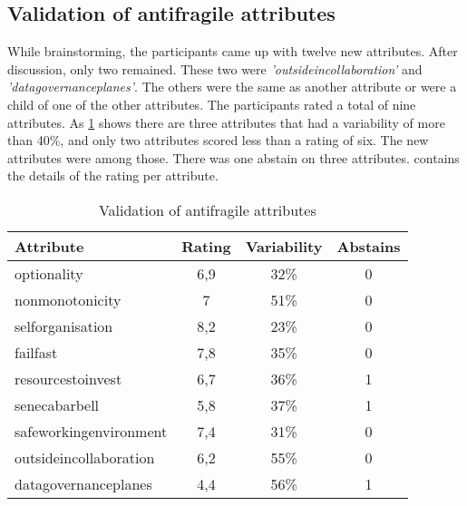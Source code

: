 \subsection{Validation of antifragile attributes}
\label{sub:validationofantifragileattributes}
While brainstorming, the participants came up with twelve new \glspl{attribute}. After discussion, only two remained. These two were \textit{'\gls{outsideincollaboration}'} and \textit{'\gls{datagovernanceplanes}'}. The others were the same as another \gls{attribute} or were a child of one of the other \glspl{attribute}. The participants rated a total of nine \glspl{attribute}. As \cref{tab:validationofantifragileattributes} shows there are three \glspl{attribute} that had a variability of more than 40\%, and only two \glspl{attribute} scored less than a rating of six. The new \glspl{attribute} were among those. There was one abstain on three \glspl{attribute}.  contains the details of the rating per \gls{attribute}.
\begin{table}[H]
	\centering
	\begin{tabular}{p{}ccc}
		\toprule
		\textbf{Attribute} & \textbf{Rating} & \textbf{Variability} & \textbf{Abstains} \\
		\midrule
		\Gls{optionality} & 6,9 & 32\% & 0 \\%
		\Gls{nonmonotonicity} & 7 & 51\% & 0 \\%
		\Gls{selforganisation} & 8,2 & 23\% & 0 \\%
		\Gls{failfast} & 7,8 & 35\% & 0 \\%
		\Gls{resourcestoinvest} & 6,7 & 36\% & 1 \\%
		\Gls{senecabarbell} & 5,8 & 37\% & 1 \\%
		\Gls{safeworkingenvironment} & 7,4 & 31\% & 0 \\%
		\Gls{outsideincollaboration} & 6,2 & 55\% & 0 \\%
		\Gls{datagovernanceplanes} & 4,4 & 56\% & 1 \\%
		\bottomrule
	\end{tabular}%
	\caption{Validation of antifragile attributes}
	\label{tab:validationofantifragileattributes}%
\end{table}%

